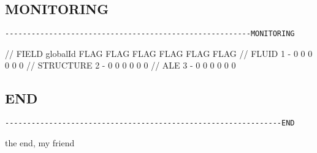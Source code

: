 

\subsection{MONITORING}
\begin{verbatim}
--------------------------------------------------------MONITORING
\end{verbatim}

// FIELD globalId FLAG FLAG FLAG FLAG FLAG FLAG
// FLUID 1 - 0 0 0 0 0 0 
// STRUCTURE 2 - 0 0 0 0 0 0 
// ALE 3 - 0 0 0 0 0 0 

\subsection{END}
\begin{verbatim}
---------------------------------------------------------------END
\end{verbatim}
the end, my friend











